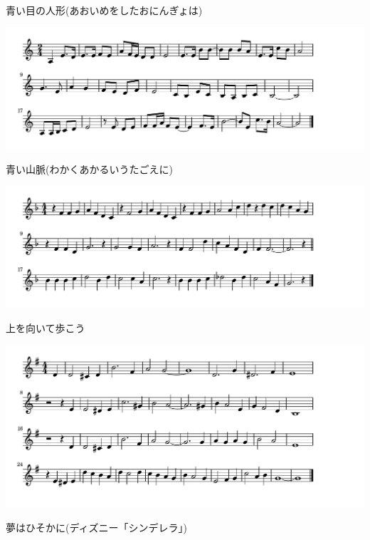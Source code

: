 \documentclass[a4paper]{ltjsarticle}
\begin{document}
\vspace{-10mm} \hspace{10mm}
青い目の人形(あおいめをしたおにんぎょは)

\includegraphics[clip]{aoisanmyaku_crop.pdf}

\vspace{-10mm} \hspace{10mm}
青い山脈(わかくあかるいうたごえに)

\includegraphics[clip]{uewomuite_crop.pdf}

\vspace{-10mm} \hspace{10mm}
上を向いて歩こう

\includegraphics[clip]{dreamisawish_crop.pdf}

\vspace{-10mm} \hspace{10mm}
夢はひそかに(ディズニー「シンデレラ」)
\end{document}

